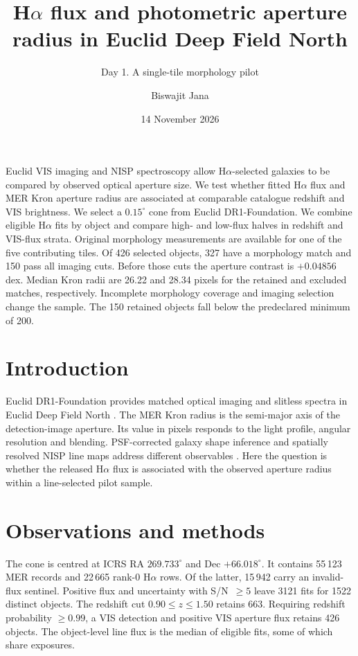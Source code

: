 \documentclass{aa}
\begin{document}
\title{H$\alpha$ flux and photometric aperture radius in Euclid Deep Field North}
\subtitle{Day 1. A single-tile morphology pilot}
\author{Biswajit Jana}
\date{14 November 2026}
\abstract
{Euclid VIS imaging and NISP spectroscopy allow H$\alpha$-selected galaxies to be compared by observed optical aperture size.}
{We test whether fitted H$\alpha$ flux and MER Kron aperture radius are associated at comparable catalogue redshift and VIS brightness.}
{We select a $0.15^{\circ}$ cone from Euclid DR1-Foundation. We combine eligible H$\alpha$ fits by object and compare high- and low-flux halves in redshift and VIS-flux strata. Original morphology measurements are available for one of the five contributing tiles.}
{Of 426 selected objects, 327 have a morphology match and 150 pass all imaging cuts. Before those cuts the aperture contrast is $+0.04856$ dex. Median Kron radii are 26.22 and 28.34 pixels for the retained and excluded matches, respectively.}
{Incomplete morphology coverage and imaging selection change the sample. The 150 retained objects fall below the predeclared minimum of 200.}
\maketitle
\section{Introduction}
Euclid DR1-Foundation provides matched optical imaging and slitless spectra in Euclid Deep Field North \citep{aussel2026}. The MER Kron radius is the semi-major axis of the detection-image aperture. Its value in pixels responds to the light profile, angular resolution and blending. PSF-corrected galaxy shape inference and spatially resolved NISP line maps address different observables \citep{dunn2026,gabarra2026}. Here the question is whether the released H$\alpha$ flux is associated with the observed aperture radius within a line-selected pilot sample.

\section{Observations and methods}
The cone is centred at ICRS RA $269.733^{\circ}$ and Dec $+66.018^{\circ}$. It contains 55\,123 MER records and 22\,665 rank-0 H$\alpha$ rows. Of the latter, 15\,942 carry an invalid-flux sentinel. Positive flux and uncertainty with S/N~$\geq5$ leave 3121 fits for 1522 distinct objects. The redshift cut $0.90\leq z\leq1.50$ retains 663. Requiring redshift probability $\geq0.99$, a VIS detection and positive VIS aperture flux retains 426 objects. The object-level line flux is the median of eligible fits, some of which share exposures.
\end{document}
